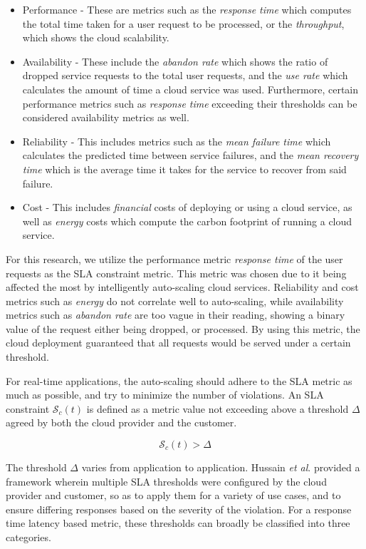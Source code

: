 \begin{itemize}
    \item Performance - These are metrics such as the \textit{response time} which computes the total time taken for a user request to be processed, or the \textit{throughput}, which shows the cloud scalability.
    \item Availability - These include the \textit{abandon rate} which shows the ratio of dropped service requests to the total user requests, and the \textit{use rate} which calculates the amount of time a cloud service was used. Furthermore, certain performance metrics such as \textit{response time} exceeding their thresholds can be considered availability metrics as well.
    \item Reliability - This includes metrics such as the \textit{mean failure time} which calculates the predicted time between service failures, and the \textit{mean recovery time} which is the average time it takes for the service to recover from said failure.
    \item Cost - This includes \textit{financial} costs of deploying or using a cloud service, as well as \textit{energy} costs which compute the carbon footprint of running a cloud service.
\end{itemize}

For this research, we utilize the performance metric \textit{response time} of the user requests as the SLA constraint metric. This metric was chosen due to it being affected the most by intelligently auto-scaling cloud services. Reliability and cost metrics such as \textit{energy} do not correlate well to auto-scaling, while availability metrics such as \textit{abandon rate} are too vague in their reading, showing a binary value of the request either being dropped, or processed. By using this metric, the cloud deployment guaranteed that all requests would be served under a certain threshold.

For real-time applications, the auto-scaling should adhere to the SLA metric as much as possible, and try to minimize the number of violations. An SLA constraint $\mathcal{S}_{c}(t)$ is defined as a metric value not exceeding above a threshold $\Delta$ agreed by both the cloud provider and the customer.

\begin{equation}
    \mathcal{S}_{c}(t) > \Delta
\end{equation}

The threshold $\Delta$ varies from application to application. Hussain \textit{et al}. \cite{hussain2016sla} provided a framework wherein multiple SLA thresholds were configured by the cloud provider and customer, so as to apply them for a variety of use cases, and to ensure differing responses based on the severity of the violation. For a response time latency based metric, these thresholds can broadly be classified into three categories.

